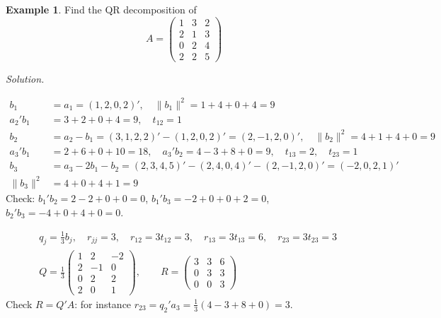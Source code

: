 \documentclass[12pt]{article}
\theoremstyle{definition}
\newtheorem{example}[theorem]{Example}
\newcommand{\boardtop}{\vspace*{-\abovedisplayskip}}
\begin{document}
\begin{example}\label{b6.17}
Find the QR decomposition of
\[
A=\begin{pmatrix}1&3&2\\2&1&3\\0&2&4\\2&2&5\end{pmatrix}
\]
\end{example}
\textit{Solution.}
\begin{board}
\boardtop
\begin{align*}
b_1&=a_1=(1,2,0,2)',\quad\lVert b_1\rVert^2=1+4+0+4=9\\
a_2'b_1&=3+2+0+4=9,\quad t_{12}=1\\
b_2&=a_2-b_1=(3,1,2,2)'-(1,2,0,2)'=(2,-1,2,0)',\quad\lVert b_2\rVert^2=4+1+4+0=9\\
a_3'b_1&=2+6+0+10=18,\quad a_3'b_2=4-3+8+0=9,\quad t_{13}=2,\quad t_{23}=1\\
b_3&=a_3-2b_1-b_2=(2,3,4,5)'-(2,4,0,4)'-(2,-1,2,0)'=(-2,0,2,1)'\\
\lVert b_3\rVert^2&=4+0+4+1=9
\end{align*}
Check: \(b_1'b_2=2-2+0+0=0\), \(b_1'b_3=-2+0+0+2=0\), \(b_2'b_3=-4+0+4+0=0\).
\end{board}
\begin{board}
\boardtop
\begin{align*}
&q_j=\tfrac13b_j,\quad r_{jj}=3,\quad r_{12}=3t_{12}=3,\quad r_{13}=3t_{13}=6,\quad r_{23}=3t_{23}=3\\
&Q=\frac13\begin{pmatrix}1&2&-2\\2&-1&0\\0&2&2\\2&0&1\end{pmatrix},\qquad
R=\begin{pmatrix}3&3&6\\0&3&3\\0&0&3\end{pmatrix}
\end{align*}
Check \(R=Q'A\): for instance \(r_{23}=q_2'a_3=\frac13(4-3+8+0)=3\).
\end{board}
\end{document}
